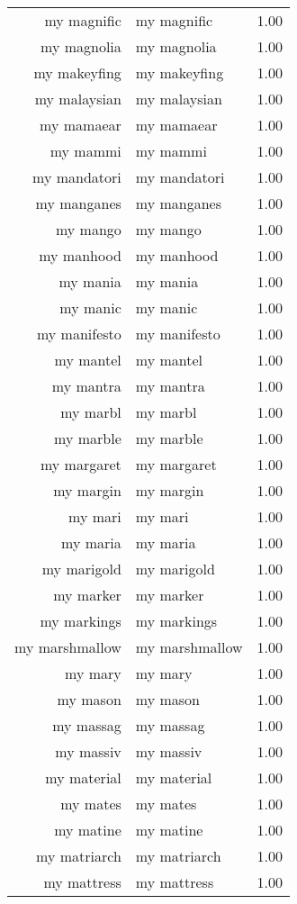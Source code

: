 \begin{table}[ht]
\begin{tabular}{rlr}
  my magnific & my magnific & 1.00 \\ 
  my magnolia & my magnolia & 1.00 \\ 
  my makeyfing & my makeyfing & 1.00 \\ 
  my malaysian & my malaysian & 1.00 \\ 
  my mamaear & my mamaear & 1.00 \\ 
  my mammi & my mammi & 1.00 \\ 
  my mandatori & my mandatori & 1.00 \\ 
  my manganes & my manganes & 1.00 \\ 
  my mango & my mango & 1.00 \\ 
  my manhood & my manhood & 1.00 \\ 
  my mania & my mania & 1.00 \\ 
  my manic & my manic & 1.00 \\ 
  my manifesto & my manifesto & 1.00 \\ 
  my mantel & my mantel & 1.00 \\ 
  my mantra & my mantra & 1.00 \\ 
  my marbl & my marbl & 1.00 \\ 
  my marble & my marble & 1.00 \\ 
  my margaret & my margaret & 1.00 \\ 
  my margin & my margin & 1.00 \\ 
  my mari & my mari & 1.00 \\ 
  my maria & my maria & 1.00 \\ 
  my marigold & my marigold & 1.00 \\ 
  my marker & my marker & 1.00 \\ 
  my markings & my markings & 1.00 \\ 
  my marshmallow & my marshmallow & 1.00 \\ 
  my mary & my mary & 1.00 \\ 
  my mason & my mason & 1.00 \\ 
  my massag & my massag & 1.00 \\ 
  my massiv & my massiv & 1.00 \\ 
  my material & my material & 1.00 \\ 
  my mates & my mates & 1.00 \\ 
  my matine & my matine & 1.00 \\ 
  my matriarch & my matriarch & 1.00 \\ 
  my mattress & my mattress & 1.00 \\ 

\end{tabular}
\end{table}
